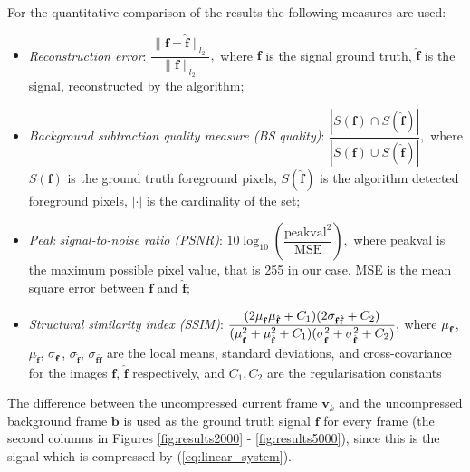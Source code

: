 \documentclass[conference]{IEEEtran}
\begin{document}
For the quantitative comparison of the results the following measures are used:
\begin{itemize}
\item \textit{Reconstruction error}: $ 
\dfrac{\|\mathbf{f}-\hat{\mathbf{f}}\|_{l_2}}{\|\mathbf{f}\|_{l_2}},$
where $\mathbf{f}$ is the signal ground truth, $\hat{\mathbf{f}}$ is the signal, reconstructed by the algorithm;
\item \textit{Background subtraction quality measure (BS quality)}: $\dfrac{|S( \mathbf{f} ) \cap S(\hat{\mathbf{f}})|}{|S( \mathbf{f}) \cup S(\hat{\mathbf{f}})|},$
where $S(\mathbf{f})$ is the ground truth foreground pixels, $S(\hat{\mathbf{f}})$ is the algorithm detected foreground pixels, $|\cdot|$ is the cardinality of the set;
\item \textit{Peak signal-to-noise ratio (PSNR)}: $10\log_{10}\left(\dfrac{\text{peakval}^2}{\text{MSE}}\right),$
where peakval is the maximum possible pixel value, that is 255 in our case. MSE is the mean square error between $\mathbf{f}$ and $\hat{\mathbf{f}}$;
\item \textit{Structural similarity index (SSIM)}: $
\dfrac{(2\mu{}_{\vphantom{\hat{\mathbf{f}}}\mathbf{f}}\mu{}_{\hat{\mathbf{f}}}+C_1)(2\sigma_{\mathbf{f}\hat{\mathbf{f}}}+C_2)}{(\mu_{\vphantom{\hat{\mathbf{f}}}\mathbf{f}}^2 + \mu_{\hat{\mathbf{f}}}^2+C_1)(\sigma_{\vphantom{\hat{\mathbf{f}}}\mathbf{f}}^2 + \sigma_{\hat{\mathbf{f}}}^2+C_2)},$
where $\mu_{\vphantom{\hat{\mathbf{f}}}\mathbf{f}}$, $\mu_{\hat{\mathbf{f}}}$, $\sigma_{\vphantom{\hat{\mathbf{f}}}\mathbf{f}}$, $\sigma_{\hat{\mathbf{f}}}$, $\sigma_{\mathbf{f}\hat{\mathbf{f}}}$ are the local means, standard deviations, and cross-covariance for the images $\mathbf{f}$, $\hat{\mathbf{f}}$ respectively, and $C_1, C_2$ are the regularisation constants
\end{itemize}
The difference between the uncompressed current frame $\mathbf{v}_k$ and the uncompressed background frame $\mathbf{b}$ is used as the ground truth signal $\mathbf{f}$ for every frame (the second columns in Figures \ref{fig:results2000} - \ref{fig:results5000}), since this is the signal which is compressed by (\ref{eq:linear_system}). 
\end{document}
